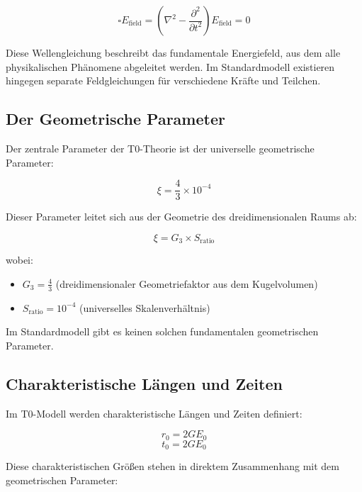 \documentclass[12pt,a4paper]{article}
\newcommand{\efield}{E_{\text{field}}}
\theoremstyle{definition}
\begin{document}
	\begin{equation}
		\boxed{\square \efield = \left(\nabla^2 - \frac{\partial^2}{\partial t^2}\right) \efield = 0}
	\end{equation}
	
	Diese Wellengleichung beschreibt das fundamentale Energiefeld, aus dem alle physikalischen Phänomene abgeleitet werden. Im Standardmodell existieren hingegen separate Feldgleichungen für verschiedene Kräfte und Teilchen.
	
	\subsection{Der Geometrische Parameter}
	
	Der zentrale Parameter der T0-Theorie ist der universelle geometrische Parameter:
	
	\begin{equation}
		\boxed{\xi = \frac{4}{3} \times 10^{-4}}
	\end{equation}
	
	Dieser Parameter leitet sich aus der Geometrie des dreidimensionalen Raums ab:
	
	\begin{equation}
		\xi = G_3 \times S_{\text{ratio}}
	\end{equation}
	
	wobei:
	\begin{itemize}
		\item $G_3 = \frac{4}{3}$ (dreidimensionaler Geometriefaktor aus dem Kugelvolumen)
		\item $S_{\text{ratio}} = 10^{-4}$ (universelles Skalenverhältnis)
	\end{itemize}
	
	Im Standardmodell gibt es keinen solchen fundamentalen geometrischen Parameter.
	
\subsection{Charakteristische Längen und Zeiten}

Im T0-Modell werden charakteristische Längen und Zeiten definiert:

\begin{equation}
	\boxed{r_0 = 2GE_0}
\end{equation}
\begin{equation}
	\boxed{t_0 = 2GE_0}
\end{equation}

Diese charakteristischen Größen stehen in direktem Zusammenhang mit dem geometrischen Parameter:
\end{document}
